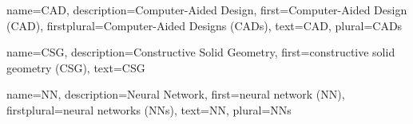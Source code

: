 \setlength{\extrarowheight}{14pt}
\setlength{\extrarowheight}{2mm} %
{
  name={CAD},
  description={Computer-Aided Design},
  first={Computer-Aided Design (CAD)},
  firstplural={Computer-Aided Designs (CADs)},
  text={CAD},
  plural={CADs}
}

{
  name={CSG},
  description={Constructive Solid Geometry},
  first={constructive solid geometry (CSG)},
  text={CSG}
}

{
  name={NN},
  description={Neural Network},
  first={neural network (NN)},
  firstplural={neural networks (NNs)},
  text={NN},
  plural={NNs}
}
